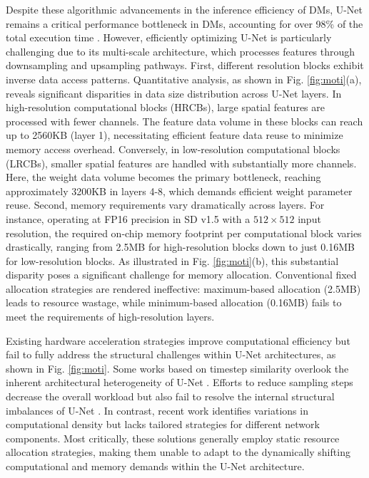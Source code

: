 Despite these algorithmic advancements in the inference efficiency of DMs, U-Net remains a critical performance bottleneck in DMs, accounting for over 98\% of the total execution time \cite{sda}. However, efficiently optimizing U-Net is particularly challenging due to its multi-scale architecture, which processes features through downsampling and upsampling pathways.
First, different resolution blocks exhibit inverse data access patterns. Quantitative analysis, as shown in Fig. \ref{fig:moti}(a), reveals significant disparities in data size distribution across U-Net layers. In high-resolution computational blocks (HRCBs), large spatial features are processed with fewer channels. The feature data volume in these blocks can reach up to 2560KB (layer 1), necessitating efficient feature data reuse to minimize memory access overhead. Conversely, in low-resolution computational blocks (LRCBs), smaller spatial features are handled with substantially more channels. Here, the weight data volume becomes the primary bottleneck, reaching approximately 3200KB in layers 4-8, which demands efficient weight parameter reuse.
Second, memory requirements vary dramatically across layers. For instance, operating at FP16 precision in SD v1.5 with a $512 \times 512$ input resolution, the required on-chip memory footprint per computational block varies drastically, ranging from 2.5MB for high-resolution blocks down to just 0.16MB for low-resolution blocks. As illustrated in Fig. \ref{fig:moti}(b), this substantial disparity poses a significant challenge for memory allocation. Conventional fixed allocation strategies are rendered ineffective: maximum-based allocation (2.5MB) leads to resource wastage, while minimum-based allocation (0.16MB) fails to meet the requirements of high-resolution layers.

Existing hardware acceleration strategies improve computational efficiency but fail to fully address the structural challenges within U-Net architectures, as shown in Fig. \ref{fig:moti}. Some works based on timestep similarity overlook the inherent architectural heterogeneity of U-Net \cite{isscc24} \cite{cambricon-d} \cite{ditto}. Efforts to reduce sampling steps decrease the overall workload but also fail to resolve the internal structural imbalances of U-Net \cite{edgediff}. In contrast, recent work \cite{cim-unet}\cite{unet_cim_isscc} identifies variations in computational density but lacks tailored strategies for different network components. Most critically, these solutions generally employ static resource allocation strategies, making them unable to adapt to the dynamically shifting computational and memory demands within the U-Net architecture.

